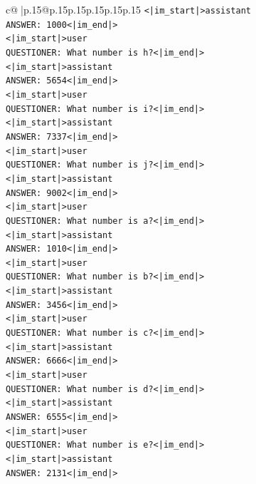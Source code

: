 \documentclass{article}
\begin{document}
{\begin{supertabular}{c@{$\;$}|p{.15\linewidth}@{}p{.15\linewidth}p{.15\linewidth}p{.15\linewidth}p{.15\linewidth}p{.15\linewidth}}
{{{\texttt{<|im\_start|>assistant} \\
\texttt{ANSWER: 1000<|im\_end|>} \\
\texttt{<|im\_start|>user} \\
\texttt{QUESTIONER: What number is h?<|im\_end|>} \\
\texttt{<|im\_start|>assistant} \\
\texttt{ANSWER: 5654<|im\_end|>} \\
\texttt{<|im\_start|>user} \\
\texttt{QUESTIONER: What number is i?<|im\_end|>} \\
\texttt{<|im\_start|>assistant} \\
\texttt{ANSWER: 7337<|im\_end|>} \\
\texttt{<|im\_start|>user} \\
\texttt{QUESTIONER: What number is j?<|im\_end|>} \\
\texttt{<|im\_start|>assistant} \\
\texttt{ANSWER: 9002<|im\_end|>} \\
\texttt{<|im\_start|>user} \\
\texttt{QUESTIONER: What number is a?<|im\_end|>} \\
\texttt{<|im\_start|>assistant} \\
\texttt{ANSWER: 1010<|im\_end|>} \\
\texttt{<|im\_start|>user} \\
\texttt{QUESTIONER: What number is b?<|im\_end|>} \\
\texttt{<|im\_start|>assistant} \\
\texttt{ANSWER: 3456<|im\_end|>} \\
\texttt{<|im\_start|>user} \\
\texttt{QUESTIONER: What number is c?<|im\_end|>} \\
\texttt{<|im\_start|>assistant} \\
\texttt{ANSWER: 6666<|im\_end|>} \\
\texttt{<|im\_start|>user} \\
\texttt{QUESTIONER: What number is d?<|im\_end|>} \\
\texttt{<|im\_start|>assistant} \\
\texttt{ANSWER: 6555<|im\_end|>} \\
\texttt{<|im\_start|>user} \\
\texttt{QUESTIONER: What number is e?<|im\_end|>} \\
\texttt{<|im\_start|>assistant} \\
\texttt{ANSWER: 2131<|im\_end|>} \\
}}}
\end{supertabular}}
\end{document}
